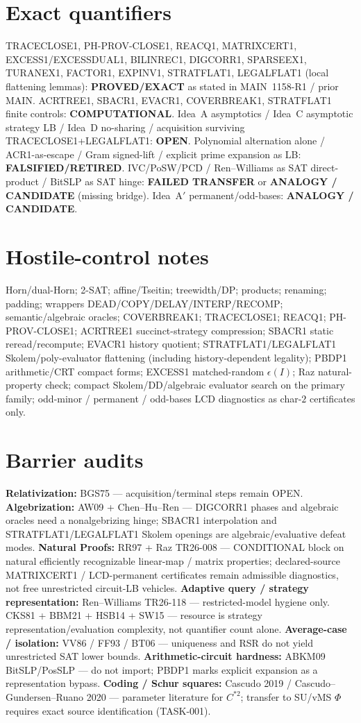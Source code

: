 \documentclass[11pt]{article}
\begin{document}
\section*{Exact quantifiers}
TRACECLOSE1, PH-PROV-CLOSE1, REACQ1, MATRIXCERT1, EXCESS1/EXCESSDUAL1, BILINREC1, DIGCORR1,
SPARSEEX1, TURANEX1, FACTOR1, EXPINV1, STRATFLAT1, LEGALFLAT1 (local flattening lemmas):
\textbf{PROVED/EXACT} as stated in MAIN~1158-R1 / prior MAIN.
ACRTREE1, SBACR1, EVACR1, COVERBREAK1, STRATFLAT1 finite controls: \textbf{COMPUTATIONAL}.
Idea~A asymptotics / Idea~C asymptotic strategy LB / Idea~D no-sharing / acquisition surviving
TRACECLOSE1+LEGALFLAT1: \textbf{OPEN}.
Polynomial alternation alone / ACR1-as-escape / Gram signed-lift / explicit prime expansion as LB:
\textbf{FALSIFIED/RETIRED}.
IVC/PoSW/PCD / Ren--Williams as SAT direct-product / BitSLP as SAT hinge:
\textbf{FAILED TRANSFER} or \textbf{ANALOGY / CANDIDATE} (missing bridge).
Idea~A$'$ permanent/odd-bases: \textbf{ANALOGY / CANDIDATE}.

\section*{Hostile-control notes}
Horn/dual-Horn; 2-SAT; affine/Tseitin; treewidth/DP; products; renaming; padding;
wrappers DEAD/COPY/DELAY/INTERP/RECOMP; semantic/algebraic oracles; COVERBREAK1;
TRACECLOSE1; REACQ1; PH-PROV-CLOSE1; ACRTREE1 succinct-strategy compression; SBACR1
static reread/recompute; EVACR1 history quotient; STRATFLAT1/LEGALFLAT1 Skolem/poly-evaluator
flattening (including history-dependent legality); PBDP1 arithmetic/CRT compact forms;
EXCESS1 matched-random $\epsilon(I)$; Raz natural-property check; compact Skolem/DD/algebraic
evaluator search on the primary family; odd-minor / permanent / odd-bases LCD diagnostics
as char-$2$ certificates only.

\section*{Barrier audits}
\textbf{Relativization:} BGS75 --- acquisition/terminal steps remain OPEN.
\textbf{Algebrization:} AW09 + Chen--Hu--Ren --- DIGCORR1 phases and algebraic oracles need a
nonalgebrizing hinge; SBACR1 interpolation and STRATFLAT1/LEGALFLAT1 Skolem openings are
algebraic/evaluative defeat modes.
\textbf{Natural Proofs:} RR97 + Raz TR26-008 --- CONDITIONAL block on natural efficiently
recognizable linear-map / matrix properties; declared-source MATRIXCERT1 / LCD-permanent
certificates remain admissible diagnostics, not free unrestricted circuit-LB vehicles.
\textbf{Adaptive query / strategy representation:} Ren--Williams TR26-118 --- restricted-model
hygiene only. CKS81 + BBM21 + HSB14 + SW15 --- resource is strategy representation/evaluation
complexity, not quantifier count alone.
\textbf{Average-case / isolation:} VV86 / FF93 / BT06 --- uniqueness and RSR do not yield
unrestricted SAT lower bounds.
\textbf{Arithmetic-circuit hardness:} ABKM09 BitSLP/PosSLP --- do not import; PBDP1 marks
explicit expansion as a representation bypass.
\textbf{Coding / Schur squares:} Cascudo 2019 / Cascudo--Gundersen--Ruano 2020 --- parameter
literature for $C^{*2}$; transfer to SU/vMS $\Phi$ requires exact source identification
(TASK-001).
\end{document}
